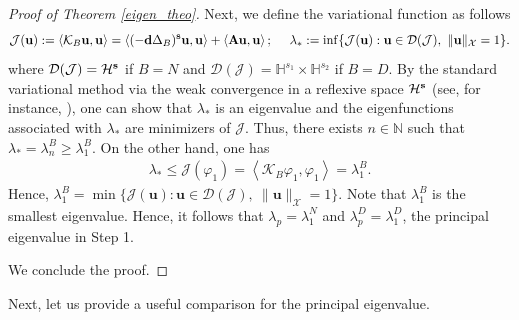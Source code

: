 \documentclass[a4paper,11pt]{amsart}
\theoremstyle{definition}
\numberwithin{equation}{section}
\theoremstyle{definition}
\begin{document}
\begin{proof}[Proof of Theorem \ref{eigen_theo}]
 
Next, we define the variational function as follows
\begin{align*}
\mathcal{J}(\textbf{u}):=\left<\mathcal{K}_B{\bf u},{\bf u}\right>=\left<(-\textbf{d}\Delta_B)^{\textbf{s}}{\bf u},{\bf u}\right> + \left<{\bf Au},{\bf u}\right>;\quad ~\lambda_*:=\inf\{ \mathcal{J}(\textbf{u}):\textbf{u}\in \mathcal{D}(\mathcal{J}),~\|\textbf{u}\|_{\mathcal{X}}=1\}.
\end{align*}
where $\mathcal{D}(\mathcal{J})=\mathcal{H}^{\bf s}$ if $B=N $ and $\mathcal{D}(\mathcal{J})=\mathbb{H}^{s_1}\times\mathbb{H}^{s_2}$ if $B=D$. By the standard variational method via the weak convergence in a reflexive space $\mathcal{H}^{\bf s}$ (see, for instance, \cite[Appendix A]{servadei_varational_2013}), one can show that $\lambda_*$ is an eigenvalue and the eigenfunctions associated with $\lambda_*$ are minimizers of $\mathcal{J}$.  Thus, there exists $n\in \mathbb{N}$ such that $\lambda_*=\lambda_n^B\geq \lambda_1^B$. On the other hand, one has
\begin{align*}
\lambda_*\leq \mathcal{J}(\varphi_1)=\left<\mathcal{K}_B\varphi_1,\varphi_1\right>=\lambda_1^B.
\end{align*}
Hence, $\lambda_1^B = \min\{ \mathcal{J}(\textbf{u}):\textbf{u}\in \mathcal{D}(\mathcal{J}),~\|\textbf{u}\|_{\mathcal{X}}=1\}$. Note that $\lambda_1^B$ is the smallest eigenvalue. Hence, it follows that $\lambda_p=\lambda_1^N$ and $\lambda_p^D=\lambda_1^D$, the principal eigenvalue in Step 1.

We conclude the proof.
\end{proof}

Next, let us provide a useful comparison for the principal eigenvalue.
\end{document}
